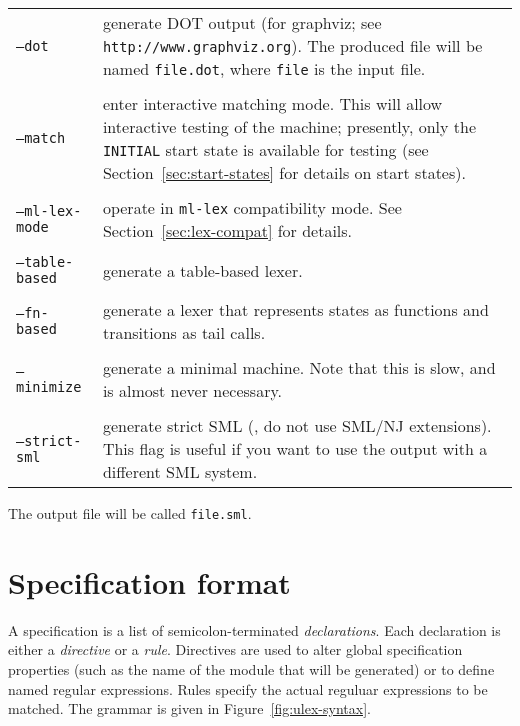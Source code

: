 \vskip 12pt
\begin{tabular}{lp{}}
  \texttt{--dot} & generate DOT output (for graphviz; see \texttt{http://www.graphviz.org}).  The produced file will be named \texttt{file.dot}, where \texttt{file} is the input file. \\
  \\
  \texttt{--match} & enter interactive matching mode.  This will allow interactive testing of the machine; presently, only the \texttt{INITIAL} start state is available for testing
  (see Section~\ref{sec:start-states} for details on start states).  \\
  \\
  \texttt{--ml-lex-mode} & operate in \texttt{ml-lex} compatibility mode.  See Section~\ref{sec:lex-compat} for details. \\
  \\
  \texttt{--table-based} & generate a table-based lexer.\\
  \\
  \texttt{--fn-based} & generate a lexer that represents states as functions and transitions as tail calls.\\
  \\
  \texttt{--minimize} & generate a minimal machine.  Note that this is slow, and is almost never necessary. \\
  \\
  \texttt{--strict-sml} & generate strict SML (\ie{}, do not use SML/NJ extensions).  This flag
    is useful if you want to use the output with a different SML system.
\end{tabular}

\vskip 10pt \noindent
The output file will be called \texttt{file.sml}.

\section{Specification format}

A \ulex{} specification is a list of semicolon-terminated \emph{declarations}.  Each declaration is either a \emph{directive} or a \emph{rule}.  Directives are used to alter global specification properties (such as the name of the module that will be generated) or to define named regular expressions.  Rules specify the actual reguluar expressions to be matched.  The grammar is given in Figure~\ref{fig:ulex-syntax}.

